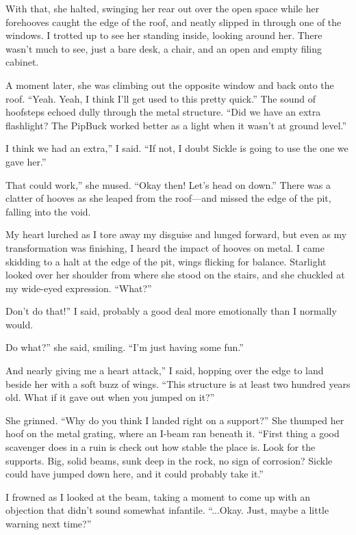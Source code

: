 With that, she halted, swinging her rear out over the open space while her forehooves caught the edge of the roof, and neatly slipped in through one of the windows. I trotted up to see her standing inside, looking around her. There wasn’t much to see, just a bare desk, a chair, and an open and empty filing cabinet.

A moment later, she was climbing out the opposite window and back onto the roof. “Yeah. Yeah, I think I’ll get used to this pretty quick.” The sound of hoofsteps echoed dully through the metal structure. “Did we have an extra flashlight? The PipBuck worked better as a light when it wasn’t at ground level.”

\leavevmode{}I think we had an extra,” I said. “If not, I doubt Sickle is going to use the one we gave her.”

\leavevmode{}That could work,” she mused. “Okay then! Let’s head on down.” There was a clatter of hooves as she leaped from the roof—and missed the edge of the pit, falling into the void.

My heart lurched as I tore away my disguise and lunged forward, but even as my transformation was finishing, I heard the impact of hooves on metal. I came skidding to a halt at the edge of the pit, wings flicking for balance. Starlight looked over her shoulder from where she stood on the stairs, and she chuckled at my wide-eyed expression. “What?”

\leavevmode{}Don’t do that!” I said, probably a good deal more emotionally than I normally would.

\leavevmode{}Do what?” she said, smiling. “I’m just having some fun.”

\leavevmode{}And nearly giving me a heart attack,” I said, hopping over the edge to land beside her with a soft buzz of wings. “This structure is at least two hundred years old. What if it gave out when you jumped on it?”

She grinned. “Why do you think I landed right on a support?” She thumped her hoof on the metal grating, where an I-beam ran beneath it. “First thing a good scavenger does in a ruin is check out how stable the place is. Look for the supports. Big, solid beams, sunk deep in the rock, no sign of corrosion? Sickle could have jumped down here, and it could probably take it.”

I frowned as I looked at the beam, taking a moment to come up with an objection that didn’t sound somewhat infantile. “...Okay. Just, maybe a little warning next time?”

